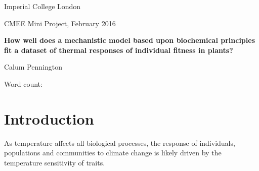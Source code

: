 \documentclass[11pt]{article}
\begin{document}
\begin{titlepage}
	\begin{center} %
		\vspace*{1cm} %
		
		\large
		Imperial College London
		
		\vspace{0.5cm}
		\large
		CMEE Mini Project, February 2016
		
		\vspace{1.5cm}
		\LARGE
		\textbf{How well does a mechanistic model based upon biochemical principles fit a dataset of thermal responses of individual fitness in plants?}\\ %
		
		\vspace{1.5cm}
		
		\LARGE
		Calum Pennington
		
		\vspace{1.5cm}
		\large
		Word count: 
		
		\vfill
	\end{center}
	
\end{titlepage}

\linenumbers

\section*{Introduction}


As temperature affects all biological processes,
the response of individuals, populations and communities to climate change is likely driven by the temperature sensitivity of traits.
\cite{Dillon2010, Gilbert2015}
\end{document}
